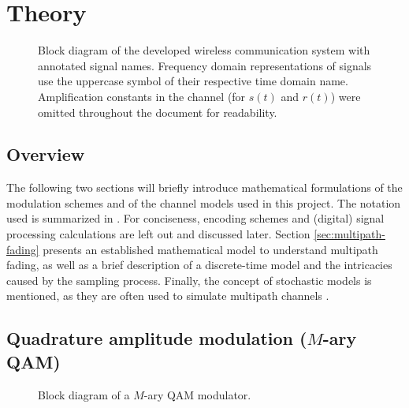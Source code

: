 
\chapter{Theory} \label{chp:theory}

\begin{figure}
	\centering
	\resizebox{.9\linewidth}{!}{
		
	}
	\caption{
		Block diagram of the developed wireless communication system with annotated signal names. Frequency domain representations of signals use the uppercase symbol of their respective time domain name. Amplification constants in the channel (for \(s(t)\) and \(r(t)\)) were omitted throughout the document for readability.
		\label{fig:notation}
	}
\end{figure}

\section{Overview}

The following two sections will briefly introduce mathematical formulations of the modulation schemes and of the channel models used in this project. The notation used is summarized in . For conciseness, encoding schemes and (digital) signal processing calculations are left out and discussed later.  Section \ref{sec:multipath-fading} presents an established mathematical model to understand multipath fading, as well as a brief description of a discrete-time model and the intricacies caused by the sampling process. Finally, the concept of stochastic models is mentioned, as they are often used to simulate multipath channels \cite{Messier,Mathis}.


\section{Quadrature amplitude modulation (\(M\)-ary QAM)}

\begin{figure}
	\centering
	\resizebox{\linewidth}{!}{
		
	}
	\caption{
		Block diagram of a \(M\)-ary QAM modulator.
		\label{fig:quadrature-modulation}
	}
\end{figure}

